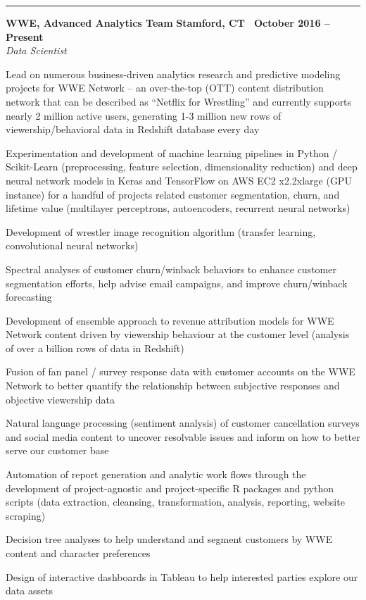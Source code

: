 \documentclass[10pt]{article}
\newcommand{\ressection}[1]{\noindent{\large\textbf{#1}}
\vspace{2pt}\hrule\vspace{4pt}}
\newcommand{\leftandright}[2]{\noindent\textbf{#1}\hfill
\textbf{#2}}
\begin{document}
\vspace{0.2cm}
\ressection{Work and Professional Research Experience}

\leftandright{WWE, Advanced Analytics Team}{Stamford, CT \textbullet\, October
2016 -- Present} \\  
\vspace{-0.8em}
\textit{Data Scientist} 
\begin{itemize*}
  \item Lead on numerous business-driven analytics research and
    predictive modeling projects for WWE Network -- an
    over-the-top (OTT) content distribution network  that can be
    described as ``Netflix for Wrestling'' and currently supports nearly
    2 million active users, generating 1-3 million new rows of viewership/behavioral 
    data in Redshift database every day
  \item Experimentation and development of machine learning pipelines
    in Python / Scikit-Learn (preprocessing, feature selection, dimensionality reduction) and 
    deep neural network models in Keras and TensorFlow 
    on AWS EC2 x2.2xlarge (GPU instance) for a handful of projects related customer segmentation, churn, 
    and lifetime value (multilayer perceptrons, autoencoders, recurrent
    neural networks) 
  \item  Development of wrestler image recognition algorithm (transfer learning,
    convolutional neural networks)
  \item  Spectral analyses of customer churn/winback behaviors 
    to enhance customer segmentation efforts, help advise email campaigns, and
    improve churn/winback forecasting 
  \item Development of ensemble approach to revenue attribution models for WWE Network content
    driven by viewership behaviour at the customer level (analysis of
    over a billion rows of data in Redshift)
  \item  Fusion of fan panel / survey response data with customer accounts on the
    WWE Network to better quantify the relationship between
    subjective responses and objective viewership data
  \item Natural language processing (sentiment analysis) of customer cancellation surveys
    and social media content to uncover resolvable issues and inform on
    how to better serve our customer base
  \item  Automation of report generation and analytic work flows
    through the development of project-agnostic and project-specific R packages 
    and python scripts
    (data extraction, cleansing, transformation, analysis, reporting,
    website scraping)
  \item  Decision tree analyses to help understand and segment
    customers by WWE content and character preferences
  \item Design of interactive dashboards in Tableau to help interested
    parties explore our data assets
\end{itemize*}
\end{document}
